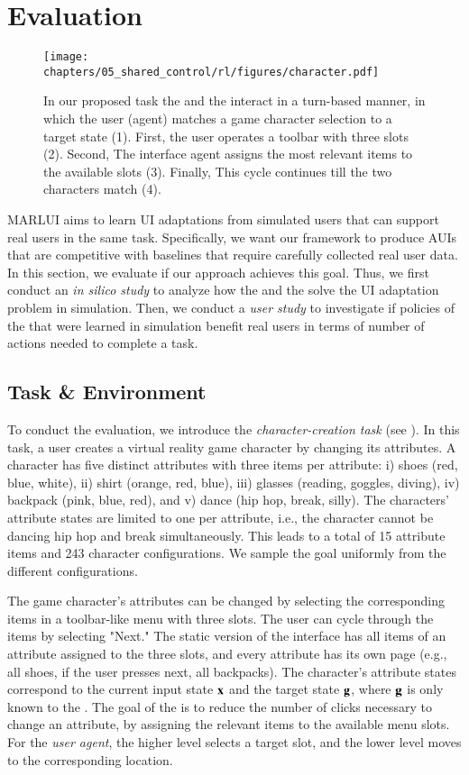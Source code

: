\section{Evaluation}
\begin{figure}[!t]
    \centering
    \texttt{[image: chapters/05\_shared\_control/rl/figures/character.pdf]}
    \caption{In our proposed task the \interfaceagent and the \useragent interact in a turn-based manner, in which the user (agent) matches a game character selection to a target state  (1). First, the user operates a toolbar with three slots (2). Second, The interface agent assigns the most relevant items to the available slots (3). Finally, This cycle continues till the two characters match (4).}
    \label{fig:task}
\end{figure}

MARLUI aims to learn UI adaptations from simulated users that can support real users in the same task. Specifically, we want our framework to produce AUIs that are competitive with baselines that require carefully collected real user data. In this section, we evaluate if our approach achieves this goal. Thus, we first conduct an \emph{in silico study} to analyze how the \interfaceagent and the \useragent solve the UI adaptation problem in simulation. Then, we conduct a \emph{user study} to investigate if policies of the \interfaceagent that were learned in simulation benefit real users in terms of number of actions needed to complete a task.

\subsection{Task \& Environment}
\label{sec:task}
To conduct the evaluation, we introduce the \emph{character-creation task} (see ).
In this task, a user creates a virtual reality game character by changing its attributes. A character has five distinct attributes with three items per attribute: i) shoes (red, blue, white), ii) shirt (orange, red, blue), iii) glasses (reading, goggles, diving), iv) backpack (pink, blue, red), and v) dance (hip hop, break, silly). The characters' attribute states are limited to one per attribute, i.e., the character cannot be dancing hip hop and break simultaneously. This leads to a total of 15 attribute items and 243 character configurations. We sample the goal uniformly from the different configurations. 

The game character's attributes can be changed by selecting the corresponding items in a toolbar-like menu with three slots. The user can cycle through the items by selecting "Next." The static version of the interface has all items of an attribute assigned to the three slots, and every attribute has its own page (e.g., all shoes, if the user presses next, all backpacks). The character's attribute states correspond to the current input state $\mathbf{x}$ and the target state $\mathbf{g}$, where $\mathbf{g}$ is only known to the \useragent. The goal of the \interfaceagent is to reduce the number of clicks necessary to change an attribute, by assigning the relevant items to the available menu slots. For the \emph{user agent}, the higher level selects a target slot, and the lower level moves to the corresponding location. 

